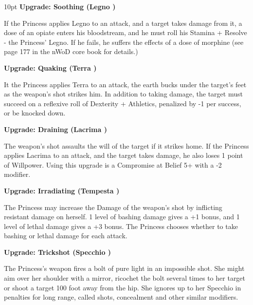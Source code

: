 \begin{myindentpar}{10pt}
\textbf{Upgrade: Soothing (Legno \textbullet\textbullet)}

If the Princess applies Legno to an attack, and a target takes damage from it, a dose of an opiate enters his bloodstream, and he must roll his Stamina + Resolve - the Princess' Legno. If he fails, he suffers the effects of a dose of morphine (see page 177 in the nWoD core book for details.)

\textbf{Upgrade: Quaking (Terra \textbullet\textbullet)}

It the Princess applies Terra to an attack, the earth bucks under the target's feet as the weapon's shot strikes him. In addition to taking damage, the target must succeed on a reflexive roll of Dexterity + Athletics, penalized by -1 per success, or be knocked down.

\textbf{Upgrade: Draining (Lacrima \textbullet\textbullet)}

The weapon's shot assaults the will of the target if it strikes home. If the Princess applies Lacrima to an attack, and the target takes damage, he also loses 1 point of Willpower. Using this upgrade is a Compromise at Belief 5+ with a -2 modifier.

\textbf{Upgrade: Irradiating (Tempesta \textbullet\textbullet)}

The Princess may increase the Damage of the weapon's shot by inflicting resistant damage on herself. 1 level of bashing damage gives a +1 bonus, and 1 level of lethal damage gives a +3 bonus. The Princess chooses whether to take bashing or lethal damage for each attack.

\textbf{Upgrade: Trickshot (Specchio \textbullet\textbullet)}

The Princess's weapon fires a bolt of pure light in an impossible shot. She might aim over her shoulder with a mirror, ricochet the bolt several times to her target or shoot a target 100 foot away from the hip. She ignores up to her Specchio in penalties for long range, called shots, concealment and other similar modifiers.\end{myindentpar}

